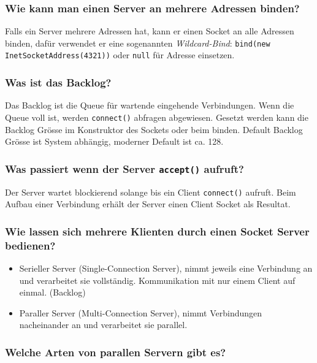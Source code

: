 \documentclass[10pt,a4paper]{scrartcl}
\begin{document}
\subsubsection{Wie kann man einen Server an mehrere Adressen binden?}

Falls ein Server mehrere Adressen hat, kann er einen Socket an alle Adressen binden, dafür
verwendet er eine sogenannten \textit{Wildcard-Bind}: \texttt{bind(new InetSocketAddress(4321))} oder
\texttt{null} für Adresse einsetzen.
  
\subsubsection{Was ist das Backlog?}

Das Backlog ist die Queue für wartende eingehende Verbindungen. Wenn die Queue voll ist, werden
\texttt{connect()} abfragen abgewiesen. Gesetzt werden kann die Backlog Grösse im Konstruktor des
Sockets oder beim binden. Default Backlog Grösse ist System abhängig, moderner Default ist ca. 128. 
  
\subsubsection{Was passiert wenn der Server \texttt{accept()} aufruft?}

Der Server wartet blockierend solange bis ein Client \texttt{connect()} aufruft. Beim Aufbau einer
Verbindung erhält der Server einen Client Socket als Resultat.
  
\subsubsection{Wie lassen sich mehrere Klienten durch einen Socket Server bedienen? }

\begin{itemize}
	\item Serieller Server (Single-Connection Server), nimmt jeweils eine Verbindung an und
		verarbeitet sie vollständig. Kommunikation mit nur einem Client auf einmal. (Backlog)
	\item Paraller Server (Multi-Connection Server), nimmt Verbindungen nacheinander an und
		verarbeitet sie parallel. 
\end{itemize}
  
\subsubsection{Welche Arten von parallen Servern gibt es? }
\end{document}

